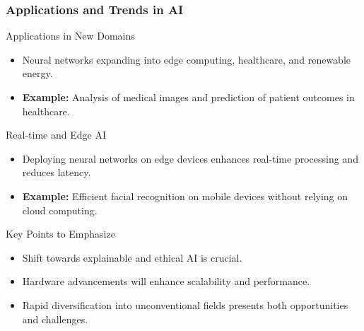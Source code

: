 \documentclass[aspectratio=169]{beamer}
\begin{document}
\begin{frame}[fragile]
    \frametitle{Applications and Trends in AI}
    \begin{block}{Applications in New Domains}
        \begin{itemize}
            \item Neural networks expanding into edge computing, healthcare, and renewable energy.
            \item \textbf{Example:} Analysis of medical images and prediction of patient outcomes in healthcare.
        \end{itemize}
    \end{block}
    \begin{block}{Real-time and Edge AI}
        \begin{itemize}
            \item Deploying neural networks on edge devices enhances real-time processing and reduces latency.
            \item \textbf{Example:} Efficient facial recognition on mobile devices without relying on cloud computing.
        \end{itemize}
    \end{block}
    \begin{block}{Key Points to Emphasize}
        \begin{itemize}
            \item Shift towards explainable and ethical AI is crucial.
            \item Hardware advancements will enhance scalability and performance.
            \item Rapid diversification into unconventional fields presents both opportunities and challenges.
        \end{itemize}
    \end{block}
\end{frame}
\end{document}
